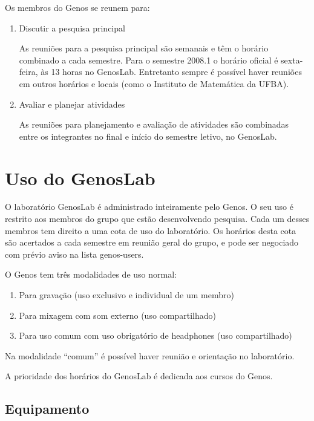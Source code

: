 \documentclass[12pt,brazil]{book}
\begin{document}
Os membros do Genos se reunem para:

\begin{enumerate}
\item Discutir a pesquisa principal

  As reuniões para a pesquisa principal são semanais e têm o horário
  combinado a cada semestre. Para o semestre 2008.1 o horário oficial
  é sexta-feira, às 13 horas no GenosLab. Entretanto sempre é possível
  haver reuniões em outros horários e locais (como o Instituto de
  Matemática da UFBA).

\item Avaliar e planejar atividades

  As reuniões para planejamento e avaliação de atividades são
  combinadas entre os integrantes no final e início do semestre
  letivo, no GenosLab.

\end{enumerate}

\section{Uso do GenosLab}
\label{sec:uso-do-genoslab}

O laboratório GenosLab é administrado inteiramente pelo Genos. O seu
uso é restrito aos membros do grupo que estão desenvolvendo
pesquisa. Cada um desses membros tem direito a uma cota de uso do
laboratório. Os horários desta cota são acertados a cada semestre em
reunião geral do grupo, e pode ser negociado com prévio aviso na lista
genos-users.

O Genos tem três modalidades de uso normal:
\begin{enumerate}
\item Para gravação (uso exclusivo e individual de um membro)
\item Para mixagem com som externo (uso compartilhado)
\item Para uso comum com uso obrigatório de headphones (uso
  compartilhado)
\end{enumerate}

Na modalidade ``comum'' é possível haver reunião e orientação no
laboratório.

A prioridade dos horários do GenosLab é dedicada aos cursos do Genos.

\subsection{Equipamento}
\label{sec:equipamento}
\end{document}
